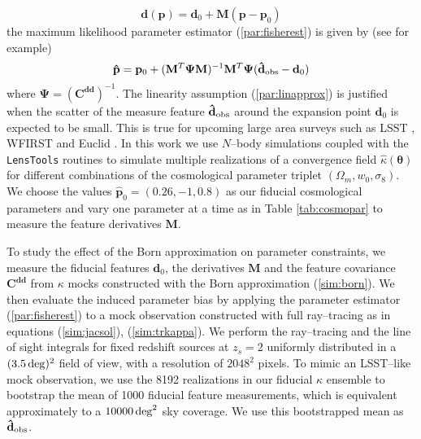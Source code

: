 \documentclass[reprint,aps,prd,superscriptaddress,showkeys,showpacs]{revtex4-1}
\newcommand{\bb}[1]{\mathbf{#1}}
\newcommand{\bbh}[1]{\mathbf{\hat{#1}}}
\newcommand{\h}[1]{\hat{#1}}
\newcommand{\ttt}[1]{\texttt{#1}}
\newcommand\pt{\pmb{\theta}}
\begin{document}
\begin{equation}
\label{par:linapprox}
\bb{d}(\bb{p}) = \bb{d}_0 + \bb{M}(\bb{p}-\bb{p}_0)
\end{equation}
%
the maximum likelihood parameter estimator (\ref{par:fisherest}) is given by (see \citep{DodelsonSchneider13,PetriVariance} for example)
\begin{equation}
\label{par:fisherest}
\bbh{p} = \bb{p}_0 + (\bb{M}^T\bb{\Psi M})^{-1} \bb{M}^T\bb{\Psi} (\bbh{d}_{\rm obs}-\bb{d}_0)
\end{equation}
%
where $\bb{\Psi}=(\bb{C}^{\bb{d}\bb{d}})^{-1}$. The linearity assumption (\ref{par:linapprox}) is justified when the scatter of the measure feature $\bbh{d}_{\rm obs}$ around the expansion point $\bb{d}_0$ is expected to be small. This is true for upcoming large area surveys such as LSST \citep{LSST}, WFIRST \citep{WFIRST} and Euclid \citep{Euclid}. In this work we use $N$--body simulations coupled with the \ttt{LensTools} routines to simulate multiple realizations of a convergence field $\h{\kappa}(\pt)$ for different combinations of the cosmological parameter triplet $(\Omega_m,w_0,\sigma_8)$. We choose the values $\bbh{p}_0=(0.26,-1,0.8)$ as our fiducial cosmological parameters and vary one parameter at a time as in Table \ref{tab:cosmopar} to measure the feature derivatives $\bb{M}$. 

To study the effect of the Born approximation on parameter constraints, we measure the fiducial features $\bb{d}_0$, the derivatives $\bb{M}$ and the feature covariance $\bb{C}^{\bb{d}\bb{d}}$ from $\kappa$ mocks constructed with the Born approximation (\ref{sim:born}). We then evaluate the induced parameter bias by applying the parameter estimator (\ref{par:fisherest}) to a mock observation constructed with full ray--tracing as in equations (\ref{sim:jacsol}), (\ref{sim:trkappa}). We perform the ray--tracing and the line of sight integrals for fixed redshift sources at $z_s=2$ uniformly distributed in a $(3.5\,{\rm deg})^2$ field of view, with a resolution of $2048^2$ pixels. To mimic an LSST--like mock observation, we use the 8192 realizations in our fiducial $\kappa$ ensemble to bootstrap the mean of 1000 fiducial feature measurements, which is equivalent approximately to a $10000\,{\rm deg}^2$ sky coverage. We use this bootstrapped mean as $\bbh{d}_{\rm obs}$.   
\end{document}

